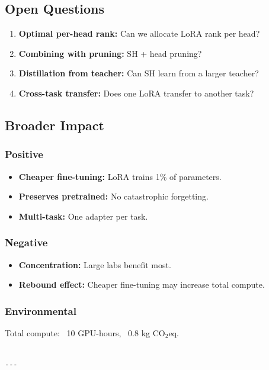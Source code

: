 \subsection{Open Questions}

\begin{enumerate}
\item \textbf{Optimal per-head rank:} Can we allocate LoRA rank per head?
\item \textbf{Combining with pruning:} SH + head pruning?
\item \textbf{Distillation from teacher:} Can SH learn from a larger teacher?
\item \textbf{Cross-task transfer:} Does one LoRA transfer to another task?

\end{enumerate}
\subsection{Broader Impact}

\subsubsection{Positive}
\begin{itemize}
\item \textbf{Cheaper fine-tuning:} LoRA trains 1\% of parameters.
\item \textbf{Preserves pretrained:} No catastrophic forgetting.
\item \textbf{Multi-task:} One adapter per task.

\end{itemize}
\subsubsection{Negative}
\begin{itemize}
\item \textbf{Concentration:} Large labs benefit most.
\item \textbf{Rebound effect:} Cheaper fine-tuning may increase total compute.

\end{itemize}
\subsubsection{Environmental}
Total compute: ~10 GPU-hours, ~0.8 kg CO$_2$eq.
\begin{lstlisting}

---
\end{lstlisting}


